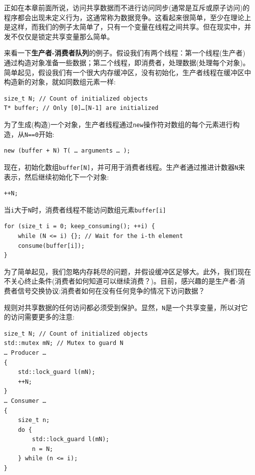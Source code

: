 
正如在本章前面所说，访问共享数据而不进行访问同步(通常是互斥或原子访问)的程序都会出现未定义行为，这通常称为数据竞争。这看起来很简单，至少在理论上是这样，而我们的例子太简单了，只有一个变量在线程之间共享。但在现实中，并发不仅仅是锁定共享变量那么简单。


来看一下\textbf{生产者-消费者队列}的例子。假设我们有两个线程：第一个线程(生产者)通过构造对象准备一些数据；第二个线程，即消费者，处理数据(处理每个对象)。简单起见，假设我们有一个很大内存缓冲区，没有初始化，生产者线程在缓冲区中构造新的对象，就如同数组元素一样:

\begin{lstlisting}[style=styleCXX]
size_t N; // Count of initialized objects
T* buffer; // Only [0]…[N-1] are initialized
\end{lstlisting}

为了生成(构造)一个对象，生产者线程通过\texttt{new}操作符对数组的每个元素进行构造，从\texttt{N==0}开始:

\begin{lstlisting}[style=styleCXX]
new (buffer + N) T( … arguments … );
\end{lstlisting}

现在，初始化数组\texttt{buffer[N]}，并可用于消费者线程。生产者通过推进计数器\texttt{N}来表示，然后继续初始化下一个对象:

\begin{lstlisting}[style=styleCXX]
++N;
\end{lstlisting}

当\texttt{i}大于\texttt{N}时，消费者线程不能访问数组元素\texttt{buffer[i]}

\begin{lstlisting}[style=styleCXX]
for (size_t i = 0; keep_consuming(); ++i) {
	while (N <= i) {}; // Wait for the i-th element
	consume(buffer[i]);
}
\end{lstlisting}

为了简单起见，我们忽略内存耗尽的问题，并假设缓冲区足够大。此外，我们现在不关心终止条件(消费者如何知道可以继续消费？)。目前，感兴趣的是生产者-消费者信号交换协议:消费者如何在没有任何竞争的情况下访问数据？

规则对共享数据的任何访问都必须受到保护。显然，\texttt{N}是一个共享变量，所以对它的访问需要更多的注意:

\begin{lstlisting}[style=styleCXX]
size_t N; // Count of initialized objects
std::mutex mN; // Mutex to guard N
… Producer …
{
	std::lock_guard l(mN);
	++N;
}
… Consumer …
{
	size_t n;
	do {
		std::lock_guard l(mN);
		n = N;
	} while (n <= i);
}
\end{lstlisting}

